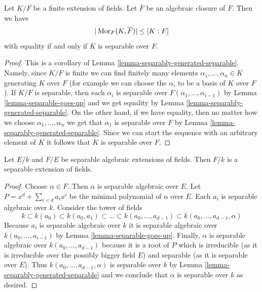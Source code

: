 \begin{lemma}
\label{lemma-separable-equality}
Let $K/F$ be a finite extension of fields. Let $\overline{F}$ be an
algebraic closure of $F$. Then we have
$$
|\mathop{\mathrm{Mor}}\nolimits_F(K, \overline{F})| \leq [K : F]
$$
with equality if and only if $K$ is separable over $F$.
\end{lemma}

\begin{proof}
This is a corollary of Lemma \ref{lemma-separably-generated-separable}.
Namely, since $K/F$ is finite we can find finitely many elements
$\alpha_1, \ldots, \alpha_n \in K$ generating $K$ over $F$ (for example
we can choose the $\alpha_i$ to be a basis of $K$ over $F$).
If $K/F$ is separable, then each $\alpha_i$ is separable over
$F(\alpha_1, \ldots, \alpha_{i - 1})$ by Lemma \ref{lemma-separable-goes-up}
and we get equality by Lemma \ref{lemma-separably-generated-separable}.
On the other hand, if we have equality, then no matter how we choose
$\alpha_1, \ldots, \alpha_n$ we get that $\alpha_1$ is separable over
$F$ by Lemma \ref{lemma-separably-generated-separable}. Since we
can start the sequence with an arbitrary element of $K$ it follows
that $K$ is separable over $F$.
\end{proof}

\begin{lemma}
\label{lemma-separable-permanence}
Let $E/k$ and $F/E$ be separable algebraic extensions of fields. Then $F/k$
is a separable extension of fields.
\end{lemma}

\begin{proof}
Choose $\alpha \in F$. Then $\alpha$ is separable algebraic over $E$.
Let $P = x^d + \sum_{i < d} a_i x^i$ be the minimal polynomial of
$\alpha$ over $E$. Each $a_i$ is separable algebraic over $k$.
Consider the tower of fields
$$
k \subset k(a_0) \subset k(a_0, a_1) \subset \ldots \subset
k(a_0, \ldots, a_{d - 1}) \subset k(a_0, \ldots, a_{d - 1}, \alpha)
$$
Because $a_i$ is separable algebraic over $k$ it is separable algebraic
over $k(a_0, \ldots, a_{i - 1})$ by Lemma \ref{lemma-separable-goes-up}.
Finally, $\alpha$ is separable algebraic over $k(a_0, \ldots, a_{d - 1})$
because it is a root of $P$ which is irreducible
(as it is irreducible over the possibly bigger field $E$)
and separable (as it is separable over $E$).
Thus $k(a_0, \ldots, a_{d - 1}, \alpha)$ is separable over $k$
by Lemma \ref{lemma-separably-generated-separable}
and we conclude that $\alpha$ is separable over $k$ as desired.
\end{proof}

